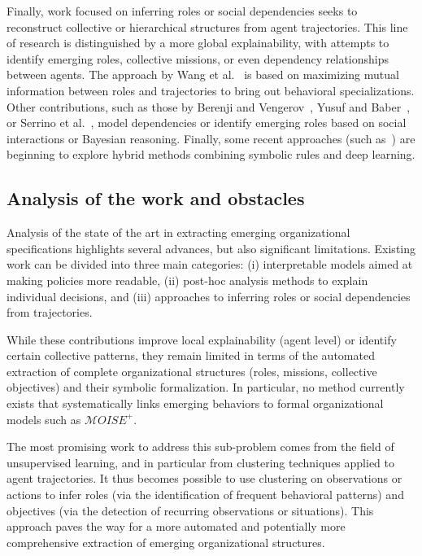 Finally, work focused on inferring roles or social dependencies seeks to reconstruct collective or hierarchical structures from agent trajectories. This line of research is distinguished by a more global explainability, with attempts to identify emerging roles, collective missions, or even dependency relationships between agents. The  approach by Wang et al.~\cite{Wang2020} is based on maximizing mutual information between roles and trajectories to bring out behavioral specializations. Other contributions, such as those by Berenji and Vengerov~\cite{berenji2000learning}, Yusuf and Baber~\cite{yusuf2020inferential}, or Serrino et al.~\cite{serrino2019finding}, model dependencies or identify emerging roles based on social interactions or Bayesian reasoning. Finally, some recent approaches (such as~\cite{subramanian2024neurosymbolic}) are beginning to explore hybrid methods combining symbolic rules and deep learning.

\subsection* {Analysis of the work and obstacles}

Analysis of the state of the art in extracting emerging organizational specifications highlights several advances, but also significant limitations. Existing work can be divided into three main categories: (i) interpretable models aimed at making policies more readable, (ii) post-hoc analysis methods to explain individual decisions, and (iii) approaches to inferring roles or social dependencies from trajectories.

While these contributions improve local explainability (agent level) or identify certain collective patterns, they remain limited in terms of the automated extraction of complete organizational structures (roles, missions, collective objectives) and their symbolic formalization. In particular, no method currently exists that systematically links emerging behaviors to formal organizational models such as $\mathcal {M}OISE^+$.

The most promising work to address this sub-problem comes from the field of unsupervised learning, and in particular from clustering techniques applied to agent trajectories. It thus becomes possible to use clustering on observations or actions to infer roles (via the identification of frequent behavioral patterns) and objectives (via the detection of recurring observations or situations). This approach paves the way for a more automated and potentially more comprehensive extraction of emerging organizational structures.

